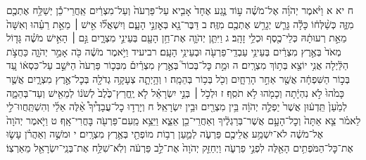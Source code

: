 \documentclass[twoside, openany, parskip=half, 11pt]{book}
\begin{document}
ח יא א וַיֹּ֨אמֶר יְהֹוָ֜ה אֶל־מֹשֶׁ֗ה ע֣וֹד נֶ֤גַע אֶחָד֙ אָבִ֤יא עַל־פַּרְעֹה֙ וְעַל־מִצְרַ֔יִם אַֽחֲרֵי־כֵ֕ן יְשַׁלַּ֥ח אֶתְכֶ֖ם מִזֶּ֑ה כְּשַׁ֨לְּח֔וֹ כָּלָ֕ה גָּרֵ֛שׁ יְגָרֵ֥שׁ אֶתְכֶ֖ם מִזֶּֽה׃ ב דַּבֶּר־נָ֖א בְּאׇזְנֵ֣י הָעָ֑ם וְיִשְׁאֲל֞וּ אִ֣ישׁ ׀ מֵאֵ֣ת רֵעֵ֗הוּ וְאִשָּׁה֙ מֵאֵ֣ת רְעוּתָ֔הּ כְּלֵי־כֶ֖סֶף וּכְלֵ֥י זָהָֽב׃ ג וַיִּתֵּ֧ן יְהֹוָ֛ה אֶת־חֵ֥ן הָעָ֖ם בְּעֵינֵ֣י מִצְרָ֑יִם גַּ֣ם ׀ הָאִ֣ישׁ מֹשֶׁ֗ה גָּד֤וֹל מְאֹד֙ בְּאֶ֣רֶץ מִצְרַ֔יִם בְּעֵינֵ֥י עַבְדֵֽי־פַרְעֹ֖ה וּבְעֵינֵ֥י הָעָֽם׃
רביעיד וַיֹּ֣אמֶר מֹשֶׁ֔ה כֹּ֖ה אָמַ֣ר יְהֹוָ֑ה כַּחֲצֹ֣ת הַלַּ֔יְלָה אֲנִ֥י יוֹצֵ֖א בְּת֥וֹךְ מִצְרָֽיִם׃ ה וּמֵ֣ת כׇּל־בְּכוֹר֮ בְּאֶ֣רֶץ מִצְרַ֒יִם֒ מִבְּכ֤וֹר פַּרְעֹה֙ הַיֹּשֵׁ֣ב עַל־כִּסְא֔וֹ עַ֚ד בְּכ֣וֹר הַשִּׁפְחָ֔ה אֲשֶׁ֖ר אַחַ֣ר הָרֵחָ֑יִם וְכֹ֖ל בְּכ֥וֹר בְּהֵמָֽה׃ ו וְהָ֥יְתָ֛ה צְעָקָ֥ה גְדֹלָ֖ה בְּכׇל־אֶ֣רֶץ מִצְרָ֑יִם אֲשֶׁ֤ר כָּמֹ֙הוּ֙ לֹ֣א נִהְיָ֔תָה וְכָמֹ֖הוּ לֹ֥א תֹסִֽף׃ ז וּלְכֹ֣ל ׀ בְּנֵ֣י יִשְׂרָאֵ֗ל לֹ֤א יֶֽחֱרַץ־כֶּ֙לֶב֙ לְשֹׁנ֔וֹ לְמֵאִ֖ישׁ וְעַד־בְּהֵמָ֑ה לְמַ֙עַן֙ תֵּֽדְע֔וּן אֲשֶׁר֙ יַפְלֶ֣ה יְהֹוָ֔ה בֵּ֥ין מִצְרַ֖יִם וּבֵ֥ין יִשְׂרָאֵֽל׃ ח וְיָרְד֣וּ כׇל־עֲבָדֶ֩יךָ֩ אֵ֨לֶּה אֵלַ֜י וְהִשְׁתַּֽחֲווּ־לִ֣י לֵאמֹ֗ר צֵ֤א אַתָּה֙ וְכׇל־הָעָ֣ם אֲשֶׁר־בְּרַגְלֶ֔יךָ וְאַחֲרֵי־כֵ֖ן אֵצֵ֑א וַיֵּצֵ֥א מֵֽעִם־פַּרְעֹ֖ה בׇּחֳרִי־אָֽף׃
ט וַיֹּ֤אמֶר יְהֹוָה֙ אֶל־מֹשֶׁ֔ה לֹא־יִשְׁמַ֥ע אֲלֵיכֶ֖ם פַּרְעֹ֑ה לְמַ֛עַן רְב֥וֹת מוֹפְתַ֖י בְּאֶ֥רֶץ מִצְרָֽיִם׃ י וּמֹשֶׁ֣ה וְאַהֲרֹ֗ן עָשׂ֛וּ אֶת־כׇּל־הַמֹּפְתִ֥ים הָאֵ֖לֶּה לִפְנֵ֣י פַרְעֹ֑ה וַיְחַזֵּ֤ק יְהֹוָה֙ אֶת־לֵ֣ב פַּרְעֹ֔ה וְלֹֽא־שִׁלַּ֥ח אֶת־בְּנֵֽי־יִשְׂרָאֵ֖ל מֵאַרְצֽוֹ׃
\end{document}
